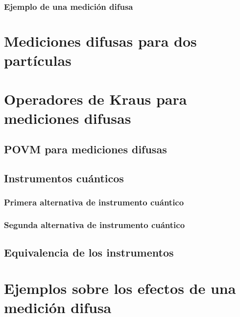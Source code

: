 \subsubsection{Ejemplo de una medición difusa}




\section{Mediciones difusas para dos partículas} %




\section{Operadores de Kraus para mediciones difusas} %




\subsection{POVM para mediciones difusas}\label{Sec_POVM_para_mediciones_difusas} %




\subsection{Instrumentos cuánticos}\label{sec:instrumentos-cuanticos} %




\subsubsection{Primera alternativa de instrumento cuántico} %

\subsubsection{Segunda alternativa de instrumento cuántico}

\subsection{Equivalencia de los instrumentos}


\section{Ejemplos sobre los efectos de una medición difusa} %
